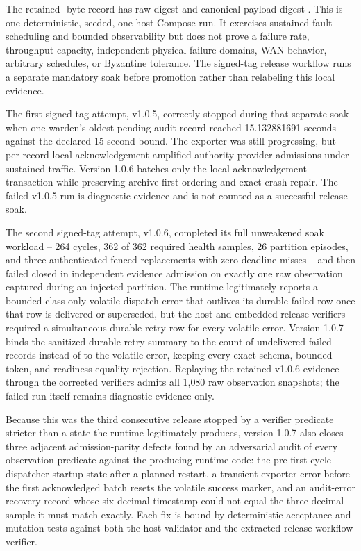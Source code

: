 \documentclass[10pt]{article}
\begin{document}
The retained \SoakEvidenceBytes-byte record has raw digest \SoakEvidenceDigestDisplay{} and
canonical payload digest \SoakPayloadDigestDisplay. This is one deterministic, seeded, one-host
Compose run. It exercises sustained fault scheduling and bounded observability but does not prove a
failure rate, throughput capacity, independent physical failure domains, WAN behavior, arbitrary
schedules, or Byzantine tolerance. The signed-tag release workflow runs a separate mandatory soak
before promotion rather than relabeling this local evidence.

The first signed-tag attempt, v1.0.5, correctly stopped during that separate soak when one
warden's oldest pending audit record reached 15.132881691 seconds against the declared 15-second
bound. The exporter was still progressing, but per-record local acknowledgement amplified
authority-provider admissions under sustained traffic. Version 1.0.6 batches only the local
acknowledgement transaction while preserving archive-first ordering and exact crash repair. The
failed v1.0.5 run is diagnostic evidence and is not counted as a successful release soak.

The second signed-tag attempt, v1.0.6, completed its full unweakened soak workload -- 264 cycles,
362 of 362 required health samples, 26 partition episodes, and three authenticated fenced
replacements with zero deadline misses -- and then failed closed in independent evidence
admission on exactly one raw observation captured during an injected partition. The runtime
legitimately reports a bounded class-only volatile dispatch error that outlives its durable
failed row once that row is delivered or superseded, but the host and embedded release verifiers
required a simultaneous durable retry row for every volatile error. Version 1.0.7 binds the
sanitized durable retry summary to the count of undelivered failed records instead of to the
volatile error, keeping every exact-schema, bounded-token, and readiness-equality rejection.
Replaying the retained v1.0.6 evidence through the corrected verifiers admits all 1{,}080 raw
observation snapshots; the failed run itself remains diagnostic evidence only.

Because this was the third consecutive release stopped by a verifier predicate stricter than a
state the runtime legitimately produces, version 1.0.7 also closes three adjacent
admission-parity defects found by an adversarial audit of every observation predicate against
the producing runtime code: the pre-first-cycle dispatcher startup state after a planned
restart, a transient exporter error before the first acknowledged batch resets the volatile
success marker, and an audit-error recovery record whose six-decimal timestamp could not equal
the three-decimal sample it must match exactly. Each fix is bound by deterministic acceptance
and mutation tests against both the host validator and the extracted release-workflow verifier.
\end{document}
